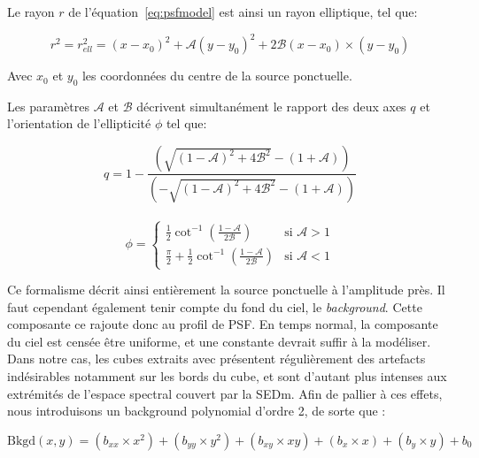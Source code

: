 \documentclass[../main/main.tex]{subfiles}
\begin{document}
Le rayon $r$ de l'équation~\ref{eq:psfmodel} est ainsi un rayon
elliptique, tel que:

\begin{equation}
  \label{eq:ellipticity}
  r^{2}=r_{ell}^{2}=(x-x_{0})^{2}+\mathcal{A}(y-y_{0})^{2}+2\mathcal{B}(x-x_{0})\times(y-y_{0})
\end{equation}

Avec $x_{0}$ et $y_{0}$ les coordonnées du centre de la source
ponctuelle.

Les paramètres $\mathcal{A}$ et $\mathcal{B}$ décrivent simultanément le
rapport des deux axes $q$ et l'orientation de l'ellipticité $\phi$ tel
que:

\begin{equation}
  \label{eq:axesratioellipse}
  q=1-\frac{\left( \sqrt{(1-\mathcal{A})^{2}+4\mathcal{B}^{2}}-(1+\mathcal{A})\right)}{\left( -\sqrt{(1-\mathcal{A})^{2}+4\mathcal{B}^{2}}-(1+\mathcal{A})\right)}
\end{equation}\\

\begin{equation}
  \label{eq:angleellipse}
  \phi= \left\{
    \begin{array}{ll}
        \frac{1}{2}\cot^{-1}\left(\frac{1-\mathcal{A}}{2\mathcal{B}}\right) & \mbox{si } \mathcal{A}>1 \\
         \frac{\pi}{2}+\frac{1}{2}\cot^{-1}\left(\frac{1-\mathcal{A}}{2\mathcal{B}}\right) & \mbox{si } \mathcal{A}<1 
    \end{array}
\right.
\end{equation}


Ce formalisme décrit ainsi entièrement la source ponctuelle à
l'amplitude près. Il faut cependant également tenir compte du fond du
ciel, le \textit{background}. Cette composante ce rajoute donc au profil
de PSF. En temps normal, la composante du ciel est censée être uniforme,
et une constante devrait suffir à la modéliser. Dans notre cas, les
cubes extraits avec  \citep{pysedm} présentent régulièrement
des artefacts indésirables notamment sur les bords du cube, et sont
d'autant plus intenses aux extrémités de l'espace spectral couvert par
la SEDm. Afin de pallier à ces effets, nous introduisons un background
polynomial d'ordre 2, de sorte que :

\begin{equation}
  \label{eq:7}
  \text{Bkgd}(x,y) = (b_{xx}\times x^{2})+ (b_{yy}\times y^{2})+(b_{xy}\times xy)+(b_{x}\times x)+(b_{y}\times y) + b_{0}
\end{equation}
\end{document}
